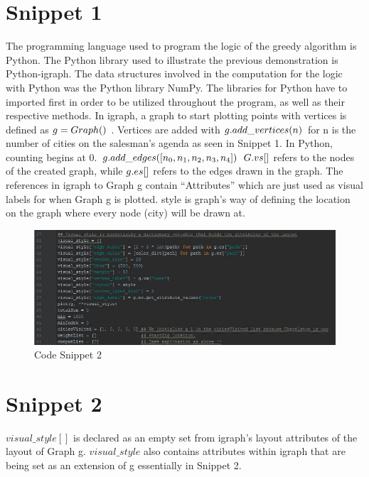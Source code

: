 \documentclass[a4paper,11pt]{scrartcl}
\begin{document}
\section{Snippet 1}

The programming language used to program the logic of the greedy algorithm is Python. The Python library used to illustrate the previous demonstration is Python-igraph. The data structures involved in the computation for the logic with Python was the Python library NumPy. The libraries for Python have to imported first in order to be utilized throughout the program, as well as their respective methods. In igraph, a graph to start plotting points with vertices is defined as \( $$ g = Graph() $$ \) . Vertices are added with \( $$g.add\_vertices(n)$$ \) for n is the number of cities on the salesman’s agenda as seen in Snippet 1. In Python, counting begins at 0. \( $$g.add\_edges([n_0, n_1, n_2, n_3, n_4])$$ \) \( $$G.vs[]$$ \) refers to the nodes of the created graph, while \( $$g.es[]$$ \) refers to the edges drawn in the graph. The references in igraph to Graph g contain “Attributes” which are just used as visual labels for when Graph g is plotted. style is graph's way of defining the location on the graph where every node (city) will be drawn at. 

\begin{figure}[!h]
  \centering
  \begin{minipage}[b]{0.85\textwidth}
    \includegraphics[width=\textwidth]{codepart2}
    \caption{Code Snippet 2}
  \end{minipage}
\end{figure}

\section{Snippet 2}

\(visual\_style[]\) is declared as an empty set from igraph’s layout attributes of the layout of Graph g. \( visual\_style\) also contains attributes within igraph that are being set as an extension of g essentially in Snippet 2.
\end{document}
